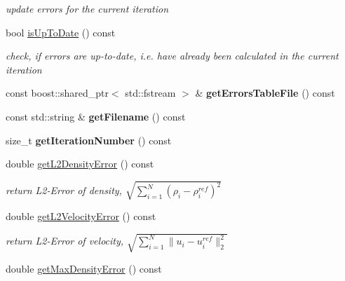 \begin{DoxyCompactItemize}
\begin{DoxyCompactList}\small\item\em update errors for the current iteration \item\end{DoxyCompactList}\item 
\hypertarget{classnatrium_1_1ErrorStats_a72dcc0b8b86335a50ee1b324bbed0e61}{
bool \hyperlink{classnatrium_1_1ErrorStats_a72dcc0b8b86335a50ee1b324bbed0e61}{isUpToDate} () const }
\label{classnatrium_1_1ErrorStats_a72dcc0b8b86335a50ee1b324bbed0e61}

\begin{DoxyCompactList}\small\item\em check, if errors are up-\/to-\/date, i.e. have already been calculated in the current iteration \item\end{DoxyCompactList}\item 
\hypertarget{classnatrium_1_1ErrorStats_a87398bf4e64d3ed9c9602235c0a0674f}{
const boost::shared\_\-ptr$<$ std::fstream $>$ \& {\bfseries getErrorsTableFile} () const }
\label{classnatrium_1_1ErrorStats_a87398bf4e64d3ed9c9602235c0a0674f}

\item 
\hypertarget{classnatrium_1_1ErrorStats_a341ef071a84aa3a2b78485ce90bca7b2}{
const std::string \& {\bfseries getFilename} () const }
\label{classnatrium_1_1ErrorStats_a341ef071a84aa3a2b78485ce90bca7b2}

\item 
\hypertarget{classnatrium_1_1ErrorStats_ab710182a15d0c548fbc8c3b071dbebd1}{
size\_\-t {\bfseries getIterationNumber} () const }
\label{classnatrium_1_1ErrorStats_ab710182a15d0c548fbc8c3b071dbebd1}

\item 
double \hyperlink{classnatrium_1_1ErrorStats_a66f817c7daaf15724d5d42de4f17a1e8}{getL2DensityError} () const 
\begin{DoxyCompactList}\small\item\em return L2-\/Error of density, $ \sqrt{ \sum_{i=1}^{N} (\rho_{i} - \rho_{i}^{ref})^{2} } $ \item\end{DoxyCompactList}\item 
double \hyperlink{classnatrium_1_1ErrorStats_a201f625a3607a814fdd645aabfe37fbc}{getL2VelocityError} () const 
\begin{DoxyCompactList}\small\item\em return L2-\/Error of velocity, $ \sqrt{ \sum_{i=1}^{N} \|u_{i} - u_{i}^{ref}\|_{2}^{2} } $ \item\end{DoxyCompactList}\item 
\hypertarget{classnatrium_1_1ErrorStats_a8e32b3e8c8d141b6cdcf5428613a875e}{
double \hyperlink{classnatrium_1_1ErrorStats_a8e32b3e8c8d141b6cdcf5428613a875e}{getMaxDensityError} () const }
\label{classnatrium_1_1ErrorStats_a8e32b3e8c8d141b6cdcf5428613a875e}


\end{DoxyCompactItemize}
